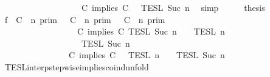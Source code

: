 \begin{isabellebody}
\ \ \ \ \ \ \ \ \ \ \ \ \ \ \ \ \ {\isasyminter}\ {\isasymlbrakk}{\isasymlbrakk}\ {\isacharparenleft}C\ implies\ C\ {\isacharhash}\ {\isasymPhi}\ {\isasymrbrakk}{\isasymrbrakk}\isactrlsub T\isactrlsub E\isactrlsub S\isactrlsub L\isactrlbsup {\isasymge}\ Suc\ n\isactrlesup {\isacartoucheclose}\ \isamarkupfalse%
\ simp\isanewline
\ \ \isamarkupfalse%
\ \isamarkupfalse%
\ {\isacharquery}thesis\isanewline
\ \ \isamarkupfalse%
\ {\isacharminus}\isanewline
\ \ \ \ \isamarkupfalse%
\ f{}{\isacharcolon}\ {\isacartoucheopen}{\isacharparenleft}{\isasymlbrakk}\ C\ {\isasymnot}{\isasymUp}\ n\ {\isasymrbrakk}\isactrlsub p\isactrlsub r\isactrlsub i\isactrlsub m\ {\isasymunion}\ {\isasymlbrakk}\ C\ {\isasymUp}\ n\ {\isasymrbrakk}\isactrlsub p\isactrlsub r\isactrlsub i\isactrlsub m\ {\isasyminter}\ {\isasymlbrakk}\ C\ {\isasymUp}\ n\ {\isasymrbrakk}\isactrlsub p\isactrlsub r\isactrlsub i\isactrlsub m{\isacharparenright}\isanewline
\ \ \ \ \ \ \ \ \ \ \ \ \ \ \ \ {\isasyminter}\ {\isasymlbrakk}\ C\ implies\ C\ {\isasymrbrakk}\isactrlsub T\isactrlsub E\isactrlsub S\isactrlsub L\isactrlbsup {\isasymge}\ Suc\ n\isactrlesup \ {\isasyminter}\ {\isacharparenleft}{\isasymlbrakk}{\isasymlbrakk}\ {\isasymPsi}\ {\isasymrbrakk}{\isasymrbrakk}\isactrlsub T\isactrlsub E\isactrlsub S\isactrlsub L\isactrlbsup {\isasymge}\ n\isactrlesup \isanewline
\ \ \ \ \ \ \ \ \ \ \ \ \ \ \ \ {\isasyminter}\ {\isasymlbrakk}{\isasymlbrakk}\ {\isasymPhi}\ {\isasymrbrakk}{\isasymrbrakk}\isactrlsub T\isactrlsub E\isactrlsub S\isactrlsub L\isactrlbsup {\isasymge}\ Suc\ n\isactrlesup {\isacharparenright}\isanewline
\ \ \ \ \ \ \ \ \ \ \ \ \ \ {\isacharequal}\ {\isasymlbrakk}{\isasymlbrakk}\ {\isacharparenleft}C\ implies\ C\ {\isacharhash}\ {\isasymPsi}\ {\isasymrbrakk}{\isasymrbrakk}\isactrlsub T\isactrlsub E\isactrlsub S\isactrlsub L\isactrlbsup {\isasymge}\ n\isactrlesup \ {\isasyminter}\ {\isasymlbrakk}{\isasymlbrakk}\ {\isasymPhi}\ {\isasymrbrakk}{\isasymrbrakk}\isactrlsub T\isactrlsub E\isactrlsub S\isactrlsub L\isactrlbsup {\isasymge}\ Suc\ n\isactrlesup {\isacartoucheclose}\isanewline
\ \ \ \ \ \ \isamarkupfalse%
\ TESL{\isacharunderscore}interp{\isacharunderscore}stepwise{\isacharunderscore}implies{\isacharunderscore}coind{\isacharunderscore}unfold\isanewline

\end{isabellebody}
